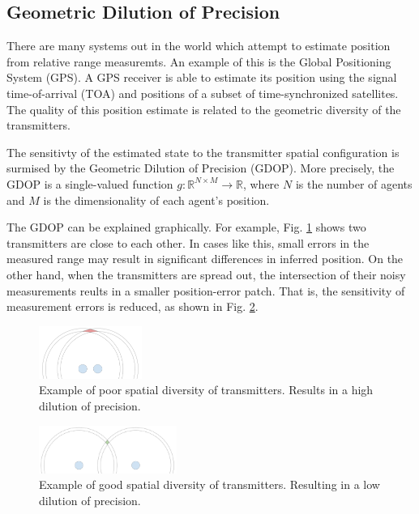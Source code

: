 \documentclass[conference]{IEEEtran}
\begin{document}
\subsection{Geometric Dilution of Precision}
There are many systems out in the world which attempt to estimate position from relative range measuremts. An example of this is the Global Positioning System (GPS). A GPS receiver is able to estimate its position using the signal time-of-arrival (TOA) and positions of a subset of time-synchronized satellites. The quality of this position estimate is related to the geometric diversity of the transmitters. 

The sensitivty of the estimated state to the transmitter spatial configuration is surmised by the Geometric Dilution of Precision (GDOP). More precisely, the GDOP is a single-valued function $g: \mathbb{R}^{N \times M} \to \mathbb{R}$, where $N$ is the number of agents and $M$ is the dimensionality of each agent's position.

The GDOP can be explained graphically. For example, Fig. \ref{bad_gdop} shows two transmitters are close to each other. In cases like this, small errors in the measured range may result in significant differences in inferred position. On the other hand, when the transmitters are spread out, the intersection of their noisy measurements reults in a smaller position-error patch. That is, the sensitivity of measurement errors is reduced, as shown in Fig. \ref{good_gdop}.

\begin{figure}[h!]
\begin{center}\includegraphics[width=0.3\textwidth]{img/bad_gdop.png}
\caption{Example of poor spatial diversity of transmitters. Results in a high dilution of precision.}
\label{bad_gdop}
\end{center}
\end{figure}

\begin{figure}[h!]
\begin{center}\includegraphics[width=0.4\textwidth]{img/good_gdop.png}
\caption{Example of good spatial diversity of transmitters. Resulting in a low dilution of precision.}
\label{good_gdop}
\end{center}
\end{figure}
\end{document}
